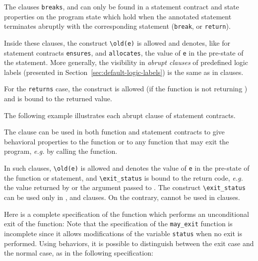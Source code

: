 The clauses \lstinline|breaks|, \continues{} 
and \returns{}
can only be found in a statement contract and
state properties on the program state which hold when the
annotated statement terminates abruptly with the corresponding
statement (\lstinline|break|, \Continue{} or \lstinline|return|).

Inside these clauses, the construct \lstinline|\old(e)|
is allowed and denotes, like for statement contracts
\lstinline|ensures|, \assigns and \lstinline|allocates|, the value of
\lstinline|e| in the pre-state of the statement.
 More generally, the visibility in \textsl{abrupt clauses} of predefined 
logic labels
 (presented in Section~\ref{sec:default-logic-labels}) is the 
same as in \ensures{} clauses.

For the \lstinline|returns| case, the \result{}
construct is allowed (if the function is not returning \void) and is bound
to the returned value.

\begin{example}
  The following example illustrates each abrupt
  clause of statement contracts.
\end{example}

The \exits{} clause can be used in both function and statement
contracts to give behavioral properties to the \main{} function
or to any function that may exit the program,
\emph{e.g.} by calling the \exit{} function.

In such clauses, \lstinline|\old(e)|
is allowed and denotes the value of \lstinline|e| in the pre-state of
the function or statement,
and \lstinline|\exit_status| is bound to the return code,
\emph{e.g.} the value returned by \main{} or the argument passed to \exit{}.
The  construct \lstinline|\exit_status|
can be used only in \exits{},
 \assigns{} and \allocates{} clauses. On the contrary,
\result cannot be used in \exits{} clauses.

\begin{example}
\label{ex:assigns-and-abrupt-termination}
  Here is a complete specification of the \exit{} function which
  performs an unconditional exit of the \main{} function:
  Note that the specification of the \lstinline|may_exit|
  function is incomplete since it allows modifications of the variable
  \lstinline|status| when no exit is performed.
  Using behaviors, it is possible to distinguish between the exit case
  and the normal case, as in the following specification:
\end{example}


